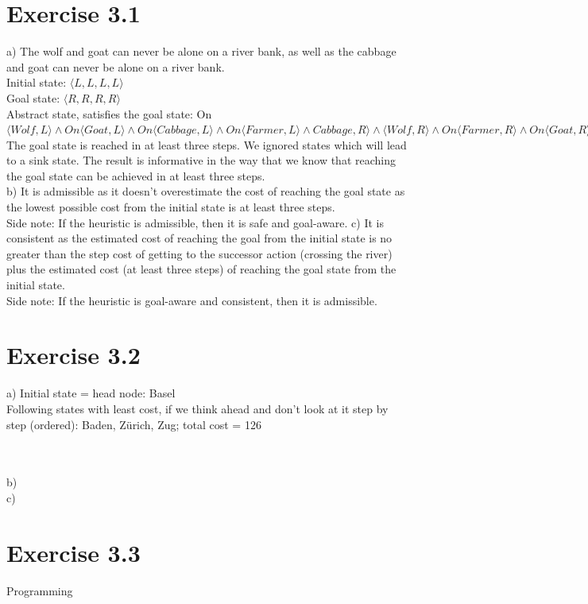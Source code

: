 \documentclass[12pt]{article}
\begin{document}
\section*{Exercise 3.1}
a) The wolf and goat can never be alone on a river bank, as well as the cabbage and goat can never be alone on a river bank. \\
Initial state: $\langle L, L, L, L \rangle$ \\
Goal state: $\langle R, R, R, R \rangle$ \\
Abstract state, satisfies the goal state: On$\langle Wolf, L \rangle \land On \langle Goat, L \rangle \land On \langle Cabbage, L \rangle \land On \langle Farmer, L \rangle \land Cabbage, R \rangle \land \langle Wolf, R \rangle \land On \langle Farmer, R \rangle \land On \langle Goat, R \rangle$\\
The goal state is reached in at least three steps. We ignored states which will lead to a sink state. The result is informative in the way that we know that reaching the goal state can be achieved in at least three steps. \\
b) It is admissible as it doesn't overestimate the cost of reaching the goal state as the lowest possible cost from the initial state is at least three steps. \\Side note: If the heuristic is admissible, then it is safe and goal-aware. \newline
c) It is consistent as the estimated cost of reaching the goal from the initial state is no greater than the step cost of getting to the successor action (crossing the river) plus the estimated cost (at least three steps) of reaching the goal state from the initial state.\\Side note: If the heuristic is goal-aware and consistent, then it is admissible. \newline



\section*{Exercise 3.2}

a) Initial state = head node: Basel \\
Following states with least cost, if we think ahead and don't look at it step by step (ordered): Baden, Zürich, Zug; total cost = 126 \\ \\
 \\
b)   \\
c) \newline


\section*{Exercise 3.3}

Programming
\end{document}
